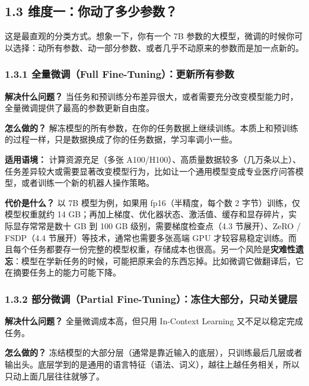 \documentclass[
  chinese,
]{ctexart}
\begin{document}
\subsection{1.3
维度一：你动了多少参数？}\label{ux7ef4ux5ea6ux4e00ux4f60ux52a8ux4e86ux591aux5c11ux53c2ux6570}

这是最直观的分类方式。想象一下，你有一个 7B
参数的大模型，微调的时候你可以选择：动所有参数、动一部分参数、或者几乎不动原来的参数而是加一点新的。

\subsubsection{1.3.1 全量微调（Full
Fine-Tuning）：更新所有参数}\label{ux5168ux91cfux5faeux8c03full-fine-tuningux66f4ux65b0ux6240ux6709ux53c2ux6570}

\textbf{解决什么问题？}
当任务和预训练分布差异很大，或者需要充分改变模型能力时，全量微调提供了最高的参数更新自由度。

\textbf{怎么做的？}
解冻模型的所有参数，在你的任务数据上继续训练。本质上和预训练的过程一样，只是数据换成了你的任务数据，学习率调小一些。

\textbf{适用语境：} 计算资源充足（多张
A100/H100）、高质量数据较多（几万条以上）、任务差异较大或需要显著改变模型行为，比如让一个通用模型变成专业医疗问答模型，或者训练一个新的机器人操作策略。

\textbf{代价是什么？} 以 7B 模型为例，如果用 fp16（半精度，每个数 2
字节）训练，仅模型权重就约 14
GB；再加上梯度、优化器状态、激活值、缓存和显存碎片，实际显存常常是数十
GB 到 100 GB 级别，需要梯度检查点（4.3 节展开）、ZeRO / FSDP（4.4
节展开）等技术，通常也需要多张高端 GPU
才较容易稳定训练。而且每个任务都要存一份完整的模型权重，存储成本也很高。另一个风险是\textbf{灾难性遗忘}：模型在学新任务的时候，可能把原来会的东西忘掉。比如微调它做翻译后，它在摘要任务上的能力可能下降。

\subsubsection{1.3.2 部分微调（Partial
Fine-Tuning）：冻住大部分，只动关键层}\label{ux90e8ux5206ux5faeux8c03partial-fine-tuningux51bbux4f4fux5927ux90e8ux5206ux53eaux52a8ux5173ux952eux5c42}

\textbf{解决什么问题？} 全量微调成本高，但只用 In-Context Learning
又不足以稳定完成任务。

\textbf{怎么做的？}
冻结模型的大部分层（通常是靠近输入的底层），只训练最后几层或者输出头。底层学到的是通用的语言特征（语法、词义），越往上越任务相关，所以只动上面几层往往就够了。
\end{document}
